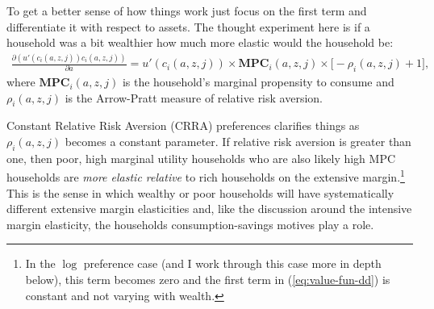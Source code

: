 \documentclass[12pt,pdftex]{article}
\begin{document}
\begin{onehalfspacing}
To get a better sense of how things work just focus on the first term and differentiate it with respect to assets. The thought experiment here is if a household was a bit wealthier how much more elastic would the household be:
\begin{align}
\frac{\partial (u'(c_{i}(a,z,j))c_{i}(a,z,j))}{\partial a} = u'(c_{i}(a,z,j))\times \mathbf{MPC}_{i}(a,z,j) \times \bigg[-\rho_{i}(a,z,j) + 1\bigg], \label{eq:elasticity-mpc}
\end{align}
where $\mathbf{MPC}_{i}(a,z,j)$ is the household's marginal propensity to consume and $\rho_{i}(a,z,j)$ is the Arrow-Pratt measure of relative risk aversion.

Constant Relative Risk Aversion (CRRA) preferences clarifies things as $\rho_{i}(a,z,j)$ becomes a constant parameter. If relative risk aversion is greater than one, then poor, high marginal utility households who are also likely high MPC households are \emph{more elastic relative} to rich households on the extensive margin.\footnote{In the $\log$ preference case (and I work through this case more in depth below), this term becomes zero and the first term in (\ref{eq:value-fun-dd}) is constant and not varying with wealth.} This is the sense in which wealthy or poor households will have systematically different extensive margin elasticities and, like the discussion around the intensive margin elasticity, the households consumption-savings motives play a role.

\end{onehalfspacing}
\end{document}
